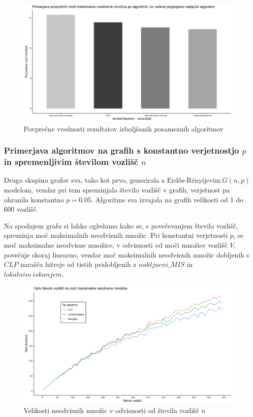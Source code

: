 \documentclass[a4paper, 12pt]{article}
\begin{document}
\begin{figure}[h!]
	\begin{center}
		\includegraphics[scale=0.10]{R_koda/pon-povpmoc-maxi.png}
		\caption{Povprečne vrednosti rezultatov izboljšanih posameznih algoritmov}
	\end{center}
\end{figure}

\newpage

\subsubsection{Primerjava algoritmov na grafih s konstantno verjetnostjo $p$ in spremenljivim številom vozlišč $n$}

Drugo skupino grafov sva, tako kot prvo, generirala z $\text{Erdős-Rényijevim}\ G(n, p)$ modelom, vendar pri tem spreminjala število vozlišč v grafih, verjetnost pa ohranila konstantno $p=0.05$.
Algoritme sva izvajala na grafih velikosti od 1 do 600 vozlišč.

Na spodnjem grafu si lahko ogledamo kako se, s povečevanjem števila vozlišč, spreminja moč maksimalnih neodvisnih množic. Pri konstantni verjetnosti $p$, se moč maksimalne neodvisne množice, v odvisnosti od 
moči množice vozlišč $V$, povečuje skoraj linearno, vendar moč maksimalnih neodvisnih množic dobljenih s $CLP$ narašča hitreje od tistih pridobljenih z $nakljucni\_MIS$ in
$lokalnim\ iskanjem$.

\newpage

\begin{figure}[h!]
	\begin{center}
		\includegraphics[scale=0.10]{R_koda/voz-moc.png}
		\caption{Velikosti neodvisnih množic v odvisnosti od števila vozlišč $n$}
	\end{center}
\end{figure}
\end{document}
